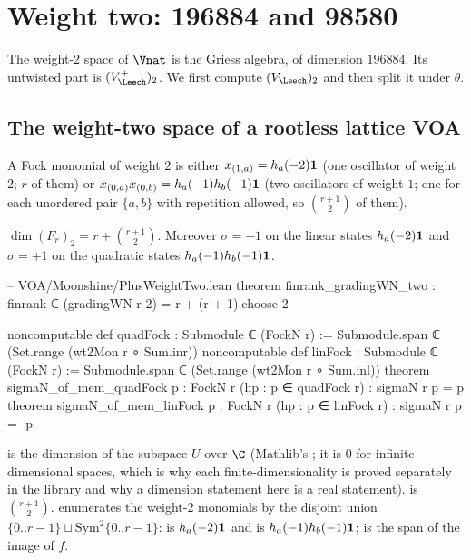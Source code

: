 \section{Weight two: 196884 and 98580}\label{ch04:sec:wttwo}

The weight-$2$ space of $\Vnat$ is the Griess algebra, of dimension $196884$. Its untwisted part
is $(V_\Leech^+)_2$. We first compute $(V_\Leech)_2$ and then split it under $\theta$.

\subsection{The weight-two space of a rootless lattice VOA}

A Fock monomial of weight $2$ is either $x_{(1,a)}=h_a(-2)\mathbf{1}$ (one oscillator of weight $2$;
$r$ of them) or $x_{(0,a)}x_{(0,b)}=h_a(-1)h_b(-1)\mathbf{1}$ (two oscillators of weight $1$; one for
each unordered pair $\{a,b\}$ with repetition allowed, so $\binom{r+1}{2}$ of them).

\begin{proposition}\label{ch04:prop:fockwt2}
$\dim(F_r)_2=r+\binom{r+1}{2}$. Moreover $\sigma=-1$ on the linear states $h_a(-2)\mathbf{1}$ and
$\sigma=+1$ on the quadratic states $h_a(-1)h_b(-1)\mathbf{1}$.
\end{proposition}

\begin{leancode}
-- VOA/Moonshine/PlusWeightTwo.lean
theorem finrank_gradingWN_two : finrank ℂ (gradingWN r 2) = r + (r + 1).choose 2

noncomputable def quadFock : Submodule ℂ (FockN r) :=
  Submodule.span ℂ (Set.range (wt2Mon r ∘ Sum.inr))
noncomputable def linFock : Submodule ℂ (FockN r) :=
  Submodule.span ℂ (Set.range (wt2Mon r ∘ Sum.inl))
theorem sigmaN_of_mem_quadFock {p : FockN r} (hp : p ∈ quadFock r) : sigmaN r p = p
theorem sigmaN_of_mem_linFock {p : FockN r} (hp : p ∈ linFock r) : sigmaN r p = -p
\end{leancode}

\begin{dictionary}
 is the dimension of the subspace $U$ over $\C$ (Mathlib's ;
it is $0$ for infinite-dimensional spaces, which is why each finite-dimensionality is proved
separately in the library and why a dimension statement here is a real statement).
 is $\binom{r+1}{2}$.  enumerates the weight-$2$ monomials by
the disjoint union $\{0..r-1\}\sqcup\mathrm{Sym}^2\{0..r-1\}$:  is $h_a(-2)\mathbf{1}$
and  is $h_a(-1)h_b(-1)\mathbf{1}$;  is the
span of the image of $f$.
\end{dictionary}

